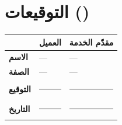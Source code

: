 \documentclass[12pt,a4paper]{article}
\begin{document}
\vspace{2em}
\section*{التوقيعات ()}

\begin{table}[H]
\centering
\renewcommand{\arraystretch}{2.5}
\begin{tabularx}{\textwidth}{L{5cm} X X}
\toprule
& \textbf{العميل} & \textbf{مقدّم الخدمة} \\
\midrule
\textbf{الاسم} & --- & --- \\
\textbf{الصفة} & --- & --- \\
\textbf{التوقيع} & \rule{4cm}{0.4pt} & \rule{4cm}{0.4pt} \\
\textbf{التاريخ} & \rule{4cm}{0.4pt} & \rule{4cm}{0.4pt} \\
\bottomrule
\end{tabularx}
\end{table}
\end{document}

